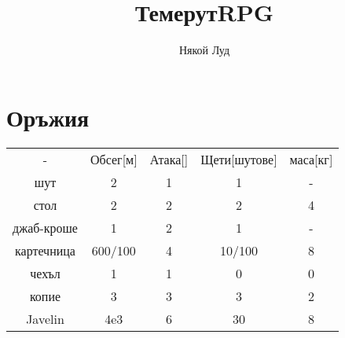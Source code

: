 \documentclass{article}
\title{ТемерутRPG}
\author{Някой Луд}
\begin{document}
\maketitle

\section{Оръжия}
\begin{tabular}{c | c| c | c | c}
- & Обсег[м] & Атака[]  & Щети[шутове] & маса[кг]  \\

шут & 2 & 1 & 1 & - \\
стол & 2 & 2 & 2 & 4  \\
джаб-кроше & 1 & 2 & 1 & - \\
картечница & 600/100 & 4 & 10/100 & 8\footnotemark  \\
чехъл & 1 & 1 & 0 & 0  \\
копие & 3 & 3 & 3 & 2  \\
Javelin & 4e3 & 6 & 30\footnotemark & 8 \\
\end{tabular}
\end{document}
